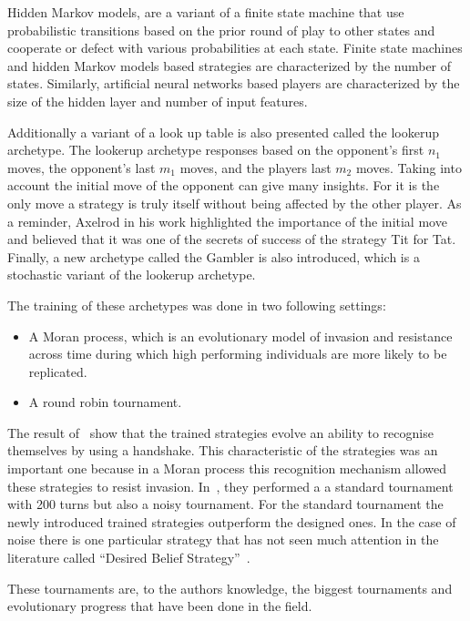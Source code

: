 \documentclass{article}
\theoremstyle{definition}
\begin{document}
Hidden Markov models, are a variant of a finite state machine that use probabilistic
transitions based on the prior round of play to other states and cooperate or
defect with various probabilities at each state. Finite state machines and hidden Markov models
based strategies are characterized by the number of states. Similarly, artificial
neural networks based players are characterized by the size of the hidden layer
and number of input features.

Additionally a variant of a look up table is also presented called the lookerup
archetype. The lookerup archetype responses based on the opponent's first \(n_1\)
moves, the opponent's last \(m_1\) moves, and the players last \(m_2\) moves.
Taking into account the initial move of the opponent can give many insights.
For it is the only move a strategy is truly itself without being affected by
the other player. As a reminder, Axelrod in his work highlighted the importance
of the initial move and believed that it was one of the secrets of success of the
strategy Tit for Tat. Finally, a new archetype called the Gambler is also introduced,
which is a stochastic variant of the lookerup archetype.

The training of these archetypes was done in two following settings:

\begin{itemize}
    \item A Moran process, which is an evolutionary model of invasion and resistance across
    time during which high performing individuals are more likely to be replicated.
    \item A round robin tournament.
\end{itemize}

The result of~\cite{KnightHGC17} show that the trained strategies evolve an ability
to recognise themselves by using a handshake. This characteristic of the strategies
was an important one because in a Moran process this recognition mechanism allowed these
strategies to resist invasion. In~\cite{Knight2017}, they performed a
a standard tournament with 200 turns but also a noisy tournament. For the standard
tournament the newly introduced trained strategies outperform the designed ones.
In the case of noise there is one particular strategy that has not seen much
attention in the literature called ``Desired Belief Strategy''~\cite{Au2006}.

These tournaments are, to the authors knowledge, the biggest tournaments and 
evolutionary progress that have been done in the field.
\end{document}

